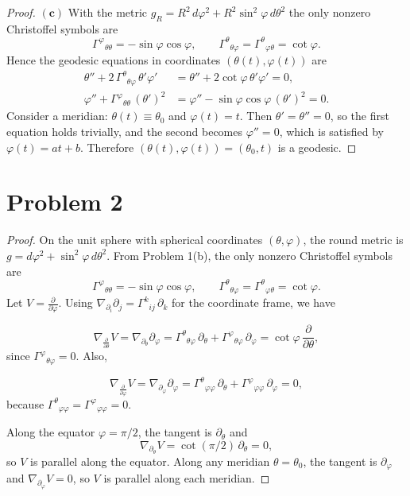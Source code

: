 \documentclass[12pt]{article}
\begin{document}
\begin{proof}
$\mathbf{(c)}$ With the metric \(g_R=R^2\,d\varphi^2+R^2\sin^2\varphi\,d\theta^2\) the only
nonzero Christoffel symbols are
\[
\Gamma^{\varphi}{}_{\theta\theta}=-\sin\varphi\cos\varphi,
\qquad
\Gamma^{\theta}{}_{\theta\varphi}=\Gamma^{\theta}{}_{\varphi\theta}=\cot\varphi .
\]
Hence the geodesic equations in coordinates \((\theta(t),\varphi(t))\) are
\begin{align*}
\theta'' + 2\,\Gamma^{\theta}{}_{\theta\varphi}\,\theta'\varphi' &= 
\theta'' + 2\cot\varphi\,\theta'\varphi' = 0,\\
\varphi'' + \Gamma^{\varphi}{}_{\theta\theta}\,(\theta')^{2} &= 
\varphi'' - \sin\varphi\cos\varphi\,(\theta')^{2}=0.
\end{align*}
Consider a meridian: \(\theta(t)\equiv \theta_0\) and
\(\varphi(t)=t\).
Then \(\theta'=\theta''=0\), so the first equation holds trivially, and the
second becomes \(\varphi''=0\), which is satisfied by \(\varphi(t)=at+b\).
Therefore \((\theta(t),\varphi(t))=(\theta_0,t)\) is a geodesic.
\end{proof}

\section*{Problem 2}
\begin{proof}
    On the unit sphere with spherical coordinates \((\theta,\varphi)\),
the round metric is \(g=d\varphi^{2}+\sin^{2}\varphi\,d\theta^{2}\).  From Problem 1(b),
the only nonzero Christoffel symbols are
\[
\Gamma^{\varphi}{}_{\theta\theta}=-\sin\varphi\cos\varphi,
\qquad
\Gamma^{\theta}{}_{\theta\varphi}=\Gamma^{\theta}{}_{\varphi\theta}=\cot\varphi .
\]
Let \(V=\frac{\partial}{\partial\varphi}\).  Using
\(\nabla_{\partial_i}\partial_j=\Gamma^{k}{}_{ij}\,\partial_k\) for the coordinate frame, we have

\[
\nabla_{\frac{\partial}{\partial\theta}}V
=\nabla_{\partial_\theta}\partial_\varphi
=\Gamma^{\theta}{}_{\theta\varphi}\,\partial_\theta
+\Gamma^{\varphi}{}_{\theta\varphi}\,\partial_\varphi
=\cot\varphi\,\frac{\partial}{\partial\theta},
\]
since \(\Gamma^{\varphi}{}_{\theta\varphi}=0\). Also, 

\[
\nabla_{\frac{\partial}{\partial\varphi}}V
=\nabla_{\partial_\varphi}\partial_\varphi
=\Gamma^{\theta}{}_{\varphi\varphi}\,\partial_\theta
+\Gamma^{\varphi}{}_{\varphi\varphi}\,\partial_\varphi
=0,
\]
because \(\Gamma^{\theta}{}_{\varphi\varphi}=\Gamma^{\varphi}{}_{\varphi\varphi}=0\).

Along the equator \(\varphi=\pi/2\), the tangent is \(\partial_\theta\) and
\[
\nabla_{\partial_\theta}V=\cot(\pi/2)\,\partial_\theta=0,
\]
so \(V\) is parallel along the equator.  Along any meridian \(\theta=\theta_0\),
the tangent is \(\partial_\varphi\) and
\(\nabla_{\partial_\varphi}V=0\), so \(V\) is parallel along each meridian.
\end{proof}
\end{document}
